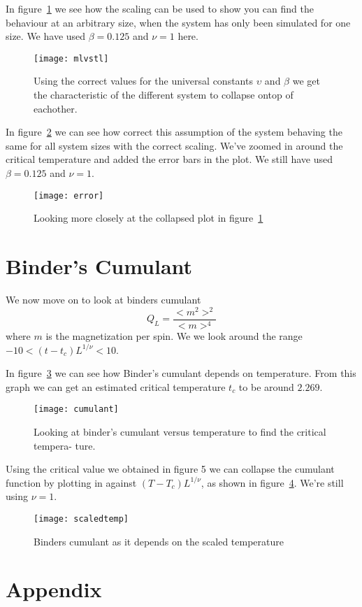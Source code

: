 \documentclass[11pt]{article}
\begin{document}
\newpage
In figure~\ref{fig:mlvstl} we see how the scaling can be used to show you can find the behaviour at
an arbitrary size, when the system has only been simulated for one size. We have used $\beta = 0.125$ and $\nu = 1$ here.
\begin{figure}[H]
	\centering
	\texttt{[image: mlvstl]}
	\caption{Using the correct values for the universal constants $\upsilon$ and $\beta$ we get the
characteristic of the different system to collapse ontop of eachother.}
	\label{fig:mlvstl}
\end{figure}

\newpage
In figure~\ref{fig:error} we can see how correct this assumption of the system behaving the same
for all system sizes with the correct scaling. We've zoomed in around the critical temperature and added the error bars in the plot. We still have used $\beta = 0.125$ and $\nu = 1$.
\begin{figure}[H]
	\centering
	\texttt{[image: error]}
	\caption{Looking more closely at the collapsed plot in figure~\ref{fig:mlvstl}}
	\label{fig:error}
\end{figure}


\section{Binder's Cumulant}
We now move on to look at binders cumulant
\begin{equation}
	Q_L = \frac{<m^2>^2}{<m>^4}
\end{equation}
where $m$ is the magnetization per spin. We we look around the range $-10 < (t-t_c)L^{1/\nu} <10$.

\newpage
In figure~\ref{fig:cumulant} we can see how Binder's cumulant depends on temperature. From this graph we can get an estimated critical temperature $t_c$ to be around $2.269$.
\begin{figure}[H]
	\centering
	\texttt{[image: cumulant]}
	\caption{Looking at binder’s cumulant versus temperature to find the critical tempera-
ture.}
	\label{fig:cumulant}
\end{figure}

\newpage
Using the critical value we obtained in figure 5 we can collapse the cumulant function
by plotting in against $(T-T_c)L^{1 / \nu}$, as shown in figure~\ref{fig:scaledtemp}. We're still using $\nu = 1$.
\begin{figure}[H]
	\centering
	\texttt{[image: scaledtemp]}
	\caption{Binders cumulant as it depends on the scaled temperature}
	\label{fig:scaledtemp}
\end{figure}
\clearpage
\appendix
\section{Appendix}
\end{document}
